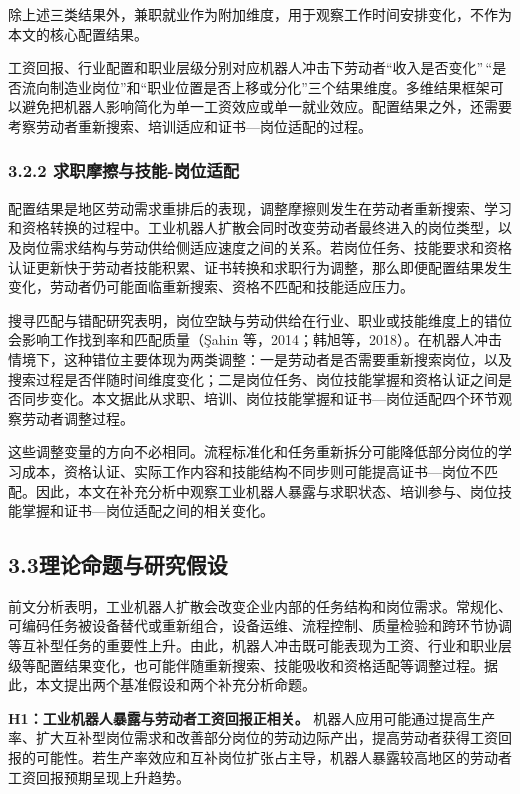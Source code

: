 除上述三类结果外，兼职就业作为附加维度，用于观察工作时间安排变化，不作为本文的核心配置结果。

工资回报、行业配置和职业层级分别对应机器人冲击下劳动者``收入是否变化''\,``是否流向制造业岗位''和``职业位置是否上移或分化''三个结果维度。多维结果框架可以避免把机器人影响简化为单一工资效应或单一就业效应。配置结果之外，还需要考察劳动者重新搜索、培训适应和证书---岗位适配的过程。

\subsubsection{3.2.2 求职摩擦与技能-岗位适配}\label{ux6c42ux804cux6469ux64e6ux4e0eux6280ux80fd-ux5c97ux4f4dux9002ux914d}

配置结果是地区劳动需求重排后的表现，调整摩擦则发生在劳动者重新搜索、学习和资格转换的过程中。工业机器人扩散会同时改变劳动者最终进入的岗位类型，以及岗位需求结构与劳动供给侧适应速度之间的关系。若岗位任务、技能要求和资格认证更新快于劳动者技能积累、证书转换和求职行为调整，那么即便配置结果发生变化，劳动者仍可能面临重新搜索、资格不匹配和技能适应压力。

搜寻匹配与错配研究表明，岗位空缺与劳动供给在行业、职业或技能维度上的错位会影响工作找到率和匹配质量（Şahin 等，2014；韩旭等，2018）。在机器人冲击情境下，这种错位主要体现为两类调整：一是劳动者是否需要重新搜索岗位，以及搜索过程是否伴随时间维度变化；二是岗位任务、岗位技能掌握和资格认证之间是否同步变化。本文据此从求职、培训、岗位技能掌握和证书---岗位适配四个环节观察劳动者调整过程。

这些调整变量的方向不必相同。流程标准化和任务重新拆分可能降低部分岗位的学习成本，资格认证、实际工作内容和技能结构不同步则可能提高证书---岗位不匹配。因此，本文在补充分析中观察工业机器人暴露与求职状态、培训参与、岗位技能掌握和证书---岗位适配之间的相关变化。

\subsection{3.3理论命题与研究假设}\label{ux7406ux8bbaux547dux9898ux4e0eux7814ux7a76ux5047ux8bbe}

前文分析表明，工业机器人扩散会改变企业内部的任务结构和岗位需求。常规化、可编码任务被设备替代或重新组合，设备运维、流程控制、质量检验和跨环节协调等互补型任务的重要性上升。由此，机器人冲击既可能表现为工资、行业和职业层级等配置结果变化，也可能伴随重新搜索、技能吸收和资格适配等调整过程。据此，本文提出两个基准假设和两个补充分析命题。

\textbf{H1：工业机器人暴露与劳动者工资回报正相关。} 机器人应用可能通过提高生产率、扩大互补型岗位需求和改善部分岗位的劳动边际产出，提高劳动者获得工资回报的可能性。若生产率效应和互补岗位扩张占主导，机器人暴露较高地区的劳动者工资回报预期呈现上升趋势。


